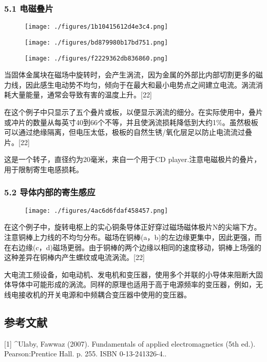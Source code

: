 \subsubsection{5.1 电磁叠片}
\begin{figure}[ht]
\centering
\texttt{[image: ./figures/1b10415612d4e3c4.png]}
\caption\label{fig_DCGY_9}
\end{figure}
\begin{figure}[ht]
\centering
\texttt{[image: ./figures/bd879980b17bd751.png]}
\caption \label{fig_DCGY_10}
\end{figure}
\begin{figure}[ht]
\centering
\texttt{[image: ./figures/f2229362db836860.png]}
\caption\label{fig_DCGY_11}
\end{figure}
当固体金属块在磁场中旋转时，会产生涡流，因为金属的外部比内部切割更多的磁力线，因此感生电动势不均匀，倾向于在最大和最小电势点之间建立电流。涡流消耗大量能量，通常会导致有害的温度上升。[22]

在这个例子中只显示了五个叠片或板，以便显示涡流的细分。在实际使用中，叠片或冲片的数量从每英寸40到66个不等，并且使涡流损耗降低到大约1\%。虽然极板可以通过绝缘隔离，但电压太低，极板的自然生锈/氧化层足以防止电流流过叠片。[22]

这是一个转子，直径约为20毫米，来自一个用于CD player.注意电磁极片的叠片，用于限制寄生电感损耗。
\subsubsection{5.2 导体内部的寄生感应}
\begin{figure}[ht]
\centering
\texttt{[image: ./figures/4ac6d6fdaf458457.png]}
\caption\label{fig_DCGY_12}
\end{figure}
在这个例子中，旋转电枢上的实心铜条导体正好穿过磁场磁体极片N的尖端下方。注意铜棒上力线的不均匀分布。磁场在铜棒(a，b)的左边缘更集中，因此更强，而在右边缘(c，d)磁场更弱。由于铜棒的两个边缘以相同的速度移动，铜棒上场强的这种差异在铜棒内产生螺纹或电流涡流。[22]

大电流工频设备，如电动机、发电机和变压器，使用多个并联的小导体来阻断大固体导体中可能形成的涡流。同样的原理也适用于高于电源频率的变压器，例如，无线电接收机的开关电源和中频耦合变压器中使用的变压器。
\subsection{参考文献}
[1]
^Ulaby, Fawwaz (2007). Fundamentals of applied electromagnetics (5th ed.). Pearson:Prentice Hall. p. 255. ISBN 0-13-241326-4..


